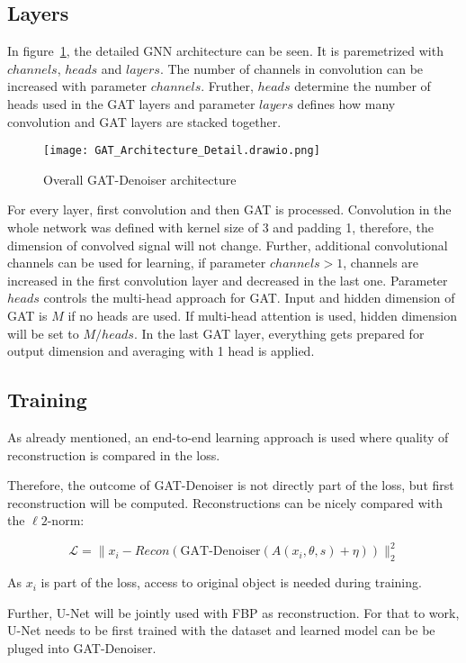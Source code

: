 \subsection{Layers}

In figure~\ref{fig:architecture-detailed}, the detailed GNN architecture can be seen.
It is paremetrized with $channels$, $heads$ and $layers$. 
The number of channels in convolution can be increased with parameter $channels$.
Fruther, $heads$ determine the number of heads used in the GAT layers and parameter 
$layers$ defines how many convolution and GAT layers are stacked together.


\begin{figure}[H]
  \centering
  \label{fig:architecture-detailed}
  \texttt{[image: GAT\_Architecture\_Detail.drawio.png]}
  \caption{Overall GAT-Denoiser architecture}
\end{figure}


For every layer, first convolution and then GAT is processed. 
Convolution in the whole network was defined with kernel size of 3 and padding 1,
therefore, the dimension of convolved signal will not change.
Further, additional convolutional channels can be used for learning, 
if parameter $channels > 1$, channels are increased in the first convolution layer 
and decreased in the last one.
Parameter $heads$ controls the multi-head approach for GAT. Input and hidden dimension
of GAT is $M$  if no heads are used.
If multi-head attention is used, hidden dimension will be set to $M / heads$.
In the last GAT layer, everything gets prepared for output dimension and 
averaging with 1 head is applied.




\subsection{Training}

As already mentioned, an end-to-end learning approach is used where quality of reconstruction is 
compared in the loss.

Therefore, the outcome of GAT-Denoiser is not directly part of the loss, but first reconstruction will be computed.
Reconstructions can be nicely compared with the $\ell2$-norm:

\begin{equation}
  \mathcal{L} = \parallel x_i - Recon ( \text{GAT-Denoiser}(A(x_i, \theta, s) + \eta)) \parallel ^2_2
\end{equation}

As $x_i$ is part of the loss, access to original object is needed during training.

Further, U-Net will be jointly used with FBP as reconstruction. For that to work, U-Net needs to be 
first trained with the dataset and learned model can be be pluged into GAT-Denoiser.


